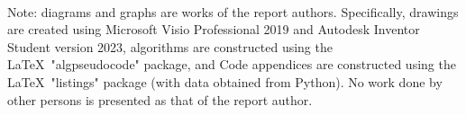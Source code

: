 	

~\\
\noindent Note: diagrams and graphs are works of the report authors. Specifically, drawings are created using Microsoft Visio Professional 2019 and Autodesk Inventor Student version 2023, algorithms are constructed using the \LaTeX~"algpseudocode" package, and Code appendices are constructed using the \LaTeX~"listings" package (with data obtained from Python). No work done by other persons is presented as that of the report author.

